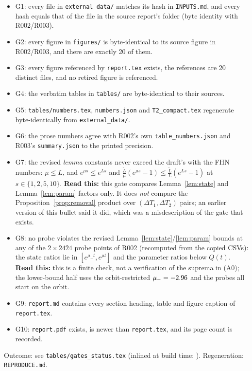 \documentclass[11pt]{article}
\theoremstyle{remark}\newtheorem{remark}{Remark}
\newcommand{\readthis}[1]{\textbf{Read this:} #1}
\begin{document}
\begin{itemize}[nosep]
\item G1: every file in \texttt{external\_data/} matches its hash in \texttt{INPUTS.md}, and every hash equals that of the file in the source report's folder (byte identity with R002/R003).
\item G2: every figure in \texttt{figures/} is byte-identical to its source figure in R002/R003, and there are exactly 20 of them.
\item G3: every figure referenced by \texttt{report.tex} exists, the references are 20 distinct files, and no retired figure is referenced.
\item G4: the verbatim tables in \texttt{tables/} are byte-identical to their sources.
\item G5: \texttt{tables/numbers.tex}, \texttt{numbers.json} and \texttt{T2\_compact.tex} regenerate byte-identically from \texttt{external\_data/}.
\item G6: the prose numbers agree with R002's own \texttt{table\_numbers.json} and R003's \texttt{summary.json} to the printed precision.
\item G7: the revised \emph{lemma} constants never exceed the draft's with the FHN numbers: $\mu\le L$, and $e^{\mu s}\le e^{Ls}$ and $\frac{\tilde L}{\mu}(e^{\mu s}-1)\le\frac{\tilde L}{L}(e^{Ls}-1)$ at $s\in\{1,2,5,10\}$. \readthis{this gate compares Lemma~\ref{lem:state} and Lemma~\ref{lem:param} factors only. It does \emph{not} compare the Proposition~\ref{prop:removal} product over $(\Delta T_1,\Delta T_2)$ pairs; an earlier version of this bullet said it did, which was a misdescription of the gate that exists.}
\item G8: no probe violates the revised Lemma~\ref{lem:state}/\ref{lem:param} bounds at any of the $2\times2424$ probe points of R002 (recomputed from the copied CSVs): the state ratios lie in $[e^{\mu_-t},e^{\mu t}]$ and the parameter ratios below $Q(t)$. \readthis{this is a finite check, not a verification of the suprema in (A0); the lower-bound half uses the orbit-restricted $\mu_-=-2.96$ and the probes all start on the orbit.}
\item G9: \texttt{report.md} contains every section heading, table and figure caption of \texttt{report.tex}.
\item G10: \texttt{report.pdf} exists, is newer than \texttt{report.tex}, and its page count is recorded.
\end{itemize}
Outcome: see \texttt{tables/gates\_status.tex} (inlined at build time: ). Regeneration: \texttt{REPRODUCE.md}.
\end{document}
